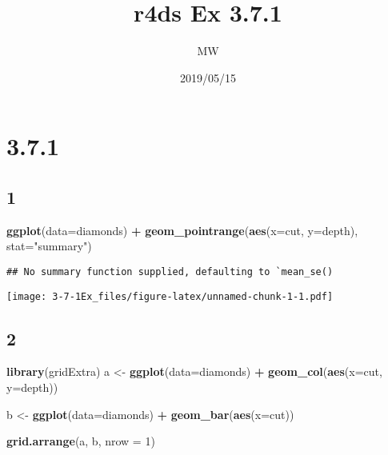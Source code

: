 \documentclass[]{article}
\title{r4ds Ex 3.7.1}
\author{MW}
\date{2019/05/15}
\newenvironment{Shaded}{\begin{snugshade}}{\end{snugshade}}
\newcommand{\DataTypeTok}[1]{\textcolor[rgb]{0.13,0.29,0.53}{#1}}
\newcommand{\DecValTok}[1]{\textcolor[rgb]{0.00,0.00,0.81}{#1}}
\newcommand{\KeywordTok}[1]{\textcolor[rgb]{0.13,0.29,0.53}{\textbf{#1}}}
\newcommand{\NormalTok}[1]{#1}
\newcommand{\OperatorTok}[1]{\textcolor[rgb]{0.81,0.36,0.00}{\textbf{#1}}}
\newcommand{\StringTok}[1]{\textcolor[rgb]{0.31,0.60,0.02}{#1}}
\begin{document}
\maketitle

\hypertarget{section}{%
\section{3.7.1}\label{section}}

\hypertarget{section-1}{%
\subsection{1}\label{section-1}}

\begin{Shaded}
\begin{Highlighting}[]
\KeywordTok{ggplot}\NormalTok{(}\DataTypeTok{data=}\NormalTok{diamonds) }\OperatorTok{+}
\StringTok{    }\KeywordTok{geom_pointrange}\NormalTok{(}\KeywordTok{aes}\NormalTok{(}\DataTypeTok{x=}\NormalTok{cut, }\DataTypeTok{y=}\NormalTok{depth), }\DataTypeTok{stat=}\StringTok{"summary"}\NormalTok{)}
\end{Highlighting}
\end{Shaded}

\begin{verbatim}
## No summary function supplied, defaulting to `mean_se()
\end{verbatim}

\texttt{[image: 3-7-1Ex\_files/figure-latex/unnamed-chunk-1-1.pdf]}

\hypertarget{section-2}{%
\subsection{2}\label{section-2}}

\begin{Shaded}
\begin{Highlighting}[]
\KeywordTok{library}\NormalTok{(gridExtra)}
\NormalTok{a <-}\StringTok{ }\KeywordTok{ggplot}\NormalTok{(}\DataTypeTok{data=}\NormalTok{diamonds) }\OperatorTok{+}
\StringTok{    }\KeywordTok{geom_col}\NormalTok{(}\KeywordTok{aes}\NormalTok{(}\DataTypeTok{x=}\NormalTok{cut, }\DataTypeTok{y=}\NormalTok{depth))}

\NormalTok{b <-}\StringTok{ }\KeywordTok{ggplot}\NormalTok{(}\DataTypeTok{data=}\NormalTok{diamonds) }\OperatorTok{+}
\StringTok{    }\KeywordTok{geom_bar}\NormalTok{(}\KeywordTok{aes}\NormalTok{(}\DataTypeTok{x=}\NormalTok{cut))}

\KeywordTok{grid.arrange}\NormalTok{(a, b, }\DataTypeTok{nrow =} \DecValTok{1}\NormalTok{)}
\end{Highlighting}
\end{Shaded}
\end{document}
